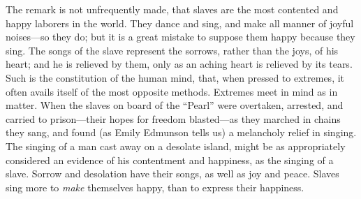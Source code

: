 The remark is not unfrequently made, that slaves are the most contented
and happy laborers in the world. They dance and sing, and make all
manner of joyful noises---so they do; but it is a great mistake to
suppose them happy because they sing. The songs of the slave represent
the sorrows, rather than the joys, of his heart; and he is relieved by
them, only as an aching heart is relieved by its tears. Such is the
constitution of the human mind, that, when pressed
{\protect\hypertarget{100}{}{}}to extremes, it often avails itself of
the most opposite methods. Extremes meet in mind as in matter. When the
slaves on board of the ``Pearl'' were overtaken, arrested, and carried
to prison---their hopes for freedom blasted---as they marched in chains
they sang, and found (as Emily Edmunson tells us) a melancholy relief in
singing. The singing of a man cast away on a desolate island, might be
as appropriately considered an evidence of his contentment and
happiness, as the singing of a slave. Sorrow and desolation have their
songs, as well as joy and peace. Slaves sing more to \emph{make}
themselves happy, than to express their happiness.


